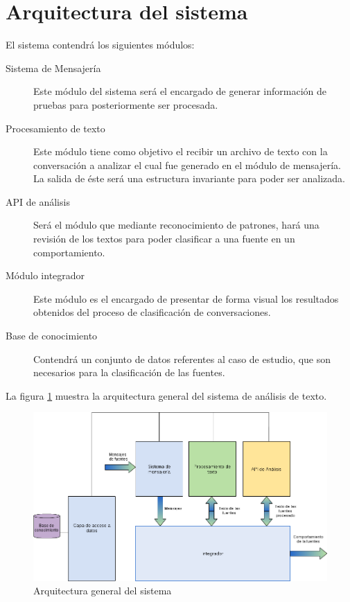 \section{Arquitectura del sistema}

El sistema contendr\'a los siguientes m\'odulos:
\begin{description}
\item[Sistema de Mensajer\'ia] Este m\'odulo del sistema ser\'a el encargado de generar informaci\'on de pruebas para posteriormente ser procesada.

\item[Procesamiento de texto] Este m\'odulo tiene como objetivo el recibir un archivo de texto con la conversaci\'on a analizar el cual fue generado en el m\'odulo de mensajer\'ia. La salida de \'este ser\'a una estructura invariante para poder ser analizada.

\item[API de an\'alisis] Ser\'a el módulo que mediante reconocimiento de patrones, har\'a una revisión de los textos para poder clasificar a una fuente en un comportamiento.

\item[M\'odulo integrador]Este m\'odulo es el encargado de presentar de forma visual los resultados obtenidos del proceso de clasificación de conversaciones. 

\item[Base de conocimiento] Contendr\'a  un conjunto de datos referentes al caso de estudio, que son necesarios para la clasificación de las fuentes. 

\end{description}


La figura \ref{arquitectura} muestra la arquitectura general del sistema de an\'alisis de texto.
\begin{figure}[h]
\begin{center}

    \includegraphics[scale=.5]{images/arquitectura}
  \caption{Arquitectura general del sistema}
  \label{arquitectura}
  \end{center}
\end{figure}
